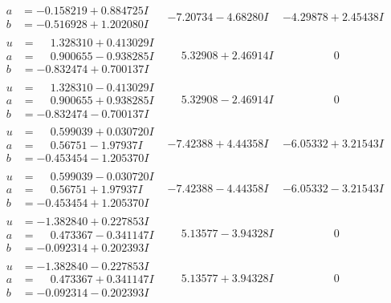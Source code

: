 \documentclass[1p]{elsarticle_modified}
\theoremstyle{definition}
\begin{document}
$$\begin{array}{c|c|c}
\begin{aligned}
a &= -0.158219 + 0.884725 I \\
b &= -0.516928 + 1.202080 I\end{aligned}
 & -7.20734 - 4.68280 I & -4.29878 + 2.45438 I \\ \hline\begin{aligned}
u &= \phantom{-}1.328310 + 0.413029 I \\
a &= \phantom{-}0.900655 - 0.938285 I \\
b &= -0.832474 + 0.700137 I\end{aligned}
 & \phantom{-}5.32908 + 2.46914 I & \phantom{-0.000000 } 0 \\ \hline\begin{aligned}
u &= \phantom{-}1.328310 - 0.413029 I \\
a &= \phantom{-}0.900655 + 0.938285 I \\
b &= -0.832474 - 0.700137 I\end{aligned}
 & \phantom{-}5.32908 - 2.46914 I & \phantom{-0.000000 } 0 \\ \hline\begin{aligned}
u &= \phantom{-}0.599039 + 0.030720 I \\
a &= \phantom{-}0.56751 - 1.97937 I \\
b &= -0.453454 - 1.205370 I\end{aligned}
 & -7.42388 + 4.44358 I & -6.05332 + 3.21543 I \\ \hline\begin{aligned}
u &= \phantom{-}0.599039 - 0.030720 I \\
a &= \phantom{-}0.56751 + 1.97937 I \\
b &= -0.453454 + 1.205370 I\end{aligned}
 & -7.42388 - 4.44358 I & -6.05332 - 3.21543 I \\ \hline\begin{aligned}
u &= -1.382840 + 0.227853 I \\
a &= \phantom{-}0.473367 - 0.341147 I \\
b &= -0.092314 + 0.202393 I\end{aligned}
 & \phantom{-}5.13577 - 3.94328 I & \phantom{-0.000000 } 0 \\ \hline\begin{aligned}
u &= -1.382840 - 0.227853 I \\
a &= \phantom{-}0.473367 + 0.341147 I \\
b &= -0.092314 - 0.202393 I\end{aligned}
 & \phantom{-}5.13577 + 3.94328 I & \phantom{-0.000000 } 0\\

\end{array}$$
\end{document}
